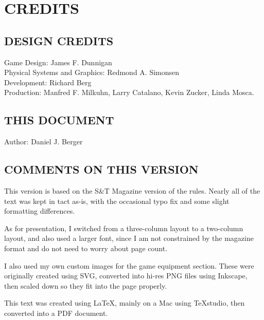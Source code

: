 \clearpage
\section{CREDITS}

\subsection{DESIGN CREDITS}

Game Design: James F. Dunnigan\\
Physical Systems and Graphics: Redmond A. Simonsen\\
Development: Richard Berg\\
Production: Manfred F. Milkuhn, Larry Catalano, Kevin Zucker, Linda Mosca.

\subsection{THIS DOCUMENT}

Author: Daniel J. Berger

\subsection{COMMENTS ON THIS VERSION}

This version is based on the S\&T Magazine version of the rules. Nearly all of the text was kept in tact as-is, with the occasional typo fix and some slight formatting differences.

As for presentation, I switched from a three-column layout to a two-column layout, and also used a larger font, since I am not constrained by the magazine format and do not need to worry about page count.

I also used my own custom images for the game equipment section. These were originally created using SVG, converted into hi-res PNG files using Inkscape, then scaled down so they fit into the page properly.

This text was created using LaTeX, mainly on a Mac using TeXstudio, then converted into a PDF document.